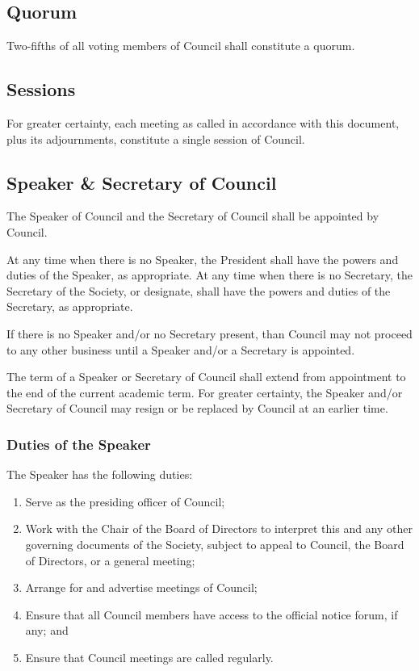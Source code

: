 \subsection{Quorum}
Two-fifths of all voting members of Council shall constitute a
quorum.

\subsection{Sessions}
For greater certainty, each meeting as called in accordance with this document,
plus its adjournments, constitute a single session of Council.

\subsection{Speaker \& Secretary of Council}
The Speaker of Council and the Secretary of Council shall
be appointed by Council. 

At any time when there is no Speaker, the President shall have the powers and
duties of the Speaker, as appropriate.  At any time when there is no Secretary,
the Secretary of the Society, or designate, shall have the powers and duties of the
Secretary, as appropriate.

If there is no Speaker and/or no Secretary present, than Council may
not proceed to any other business until a Speaker and/or a Secretary is
appointed. 

The term of a Speaker or Secretary of Council shall extend from 
appointment to the end of the current academic term. For greater certainty,
the Speaker and/or Secretary of Council may resign or be replaced by
Council at an earlier time. 

\subsubsection{Duties of the Speaker}
The Speaker has the following duties:
\begin{enumerate}
  \item Serve as the presiding officer of Council;
  \item Work with the Chair of the Board of Directors to interpret this and any
      other governing documents of the Society, subject to appeal to 
      Council, the Board of Directors, or a general meeting;
  \item Arrange for and advertise meetings of Council;
  \item Ensure that all Council members have access to the official
      notice forum, if any; and
  \item Ensure that Council meetings are called regularly.
\end{enumerate}

